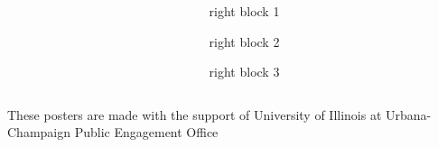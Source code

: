 \documentclass[leqno,presentation]{beamer}
\begin{document}
\begin{frame}
\begin{columns}[t]
\begin{column}{.45\linewidth}
\end{column}




\begin{column}{.25\linewidth}

\begin{block}{right block 1}

\end{block}

\begin{block}{right block 2}

\end{block}

\begin{block}{right block 3}

\end{block}

\end{column}

\end{columns}
  \begin{block}{}
   \begin{center}
   These posters are made with the support of University of Illinois at Urbana-Champaign Public Engagement Office
  \end{center}
  \end{block}



\end{frame}
\end{document}
